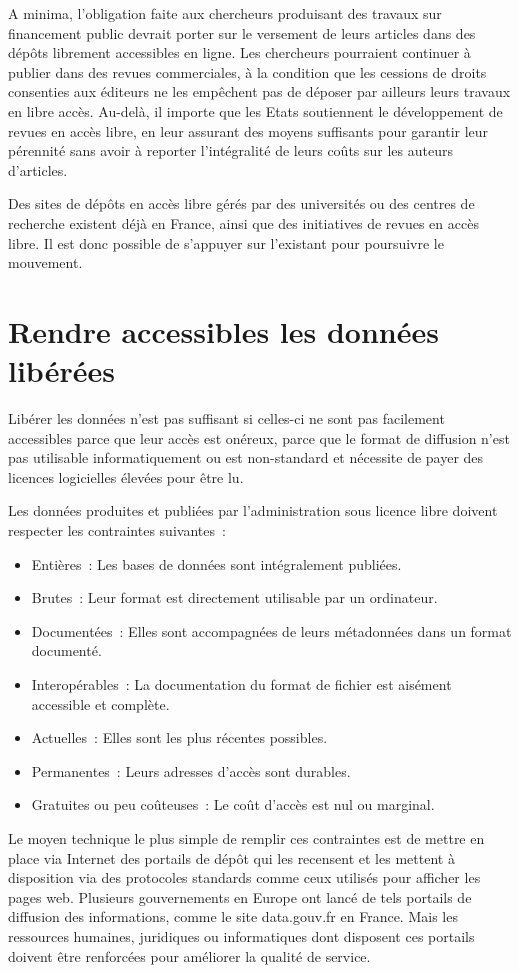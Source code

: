 A minima, l'obligation faite aux chercheurs produisant des travaux sur financement public devrait porter sur le versement de leurs articles dans des dépôts librement accessibles en ligne. Les chercheurs pourraient continuer à publier dans des revues commerciales, à la condition que les cessions de droits consenties aux éditeurs ne les empêchent pas de déposer par ailleurs leurs travaux en libre accès. Au-delà, il importe que les Etats soutiennent le développement de revues en accès libre, en leur assurant des moyens suffisants pour garantir leur pérennité sans avoir à reporter l'intégralité de leurs coûts sur les auteurs d'articles. 

Des sites de dépôts en accès libre gérés par des universités ou des centres de recherche existent déjà en France, ainsi que des initiatives de revues en accès libre. Il est donc possible de s’appuyer sur l’existant pour poursuivre le mouvement.


 \section{Rendre accessibles les données libérées}
Libérer les données n'est pas suffisant si celles-ci ne sont pas facilement accessibles parce que leur accès est onéreux, parce que le format de diffusion n'est pas utilisable informatiquement ou est non-standard et nécessite de payer des licences logicielles élevées pour être lu.

\begin{mesure}
Les données produites et publiées par l'administration sous licence libre doivent respecter les contraintes suivantes~:

\begin{itemize}
\item Entières~: Les bases de données sont intégralement publiées.
\item Brutes~: Leur format est directement utilisable par un ordinateur.
\item Documentées~: Elles sont accompagnées de leurs métadonnées dans un format documenté.
\item Interopérables~: La documentation du format de fichier est aisément accessible et complète. 
\item Actuelles~: Elles sont les plus récentes possibles.
\item Permanentes~: Leurs adresses d'accès sont durables.
\item Gratuites ou peu coûteuses~: Le coût d'accès est nul ou marginal.
\end{itemize}
\end{mesure}

Le moyen technique le plus simple de remplir ces contraintes est de mettre en place via Internet des portails de dépôt qui les recensent et les mettent à disposition via des protocoles standards comme ceux utilisés pour afficher les pages web. Plusieurs gouvernements en Europe ont lancé de tels portails de diffusion des informations, comme le site data.gouv.fr en France. Mais les ressources humaines, juridiques ou informatiques dont disposent ces portails doivent être renforcées pour améliorer la qualité de service.

